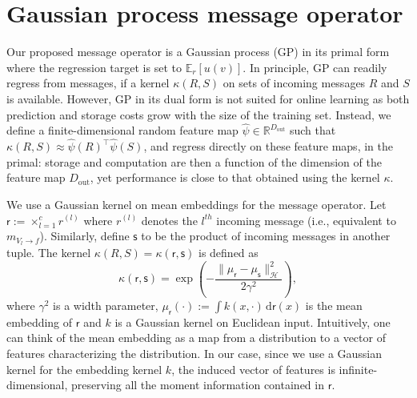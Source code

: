 \documentclass[a4paper,10pt]{article}
\begin{document}
\section{Gaussian process message operator}
Our proposed message operator is a Gaussian process (GP) in its primal form
 where the regression target is set to $\mathbb{E}_r[u(v)]$. In
principle, GP can readily regress from messages, if a kernel
$\kappa(R, S)$ on sets of incoming messages $R$ and $S$ is available. However,
GP in its dual form is not suited for online learning as both prediction and storage 
costs grow with the size of the training set. 
Instead, we define 
a finite-dimensional random feature map $\hat{\psi} \in \mathbb{R}^{D_\mathrm{out}}$ such that 
$\kappa(R, S) \approx \hat{\psi}(R)^\top \hat{\psi}(S)$, 
and regress directly on these feature maps, in the primal: storage and computation 
are then a function of the dimension of the feature map $D_\mathrm{out}$, yet
performance is close to that obtained using the kernel $\kappa$.

We use a Gaussian kernel on mean embeddings for the message operator. Let 
$\mathsf{r}:= \times_{l=1}^c r^{(l)}$ where $r^{(l)}$ denotes the $l^{th}$
incoming message (i.e., equivalent to $m_{V_l \rightarrow f}$). Similarly,
define $\mathsf{s}$ to be the product of incoming messages in another tuple. 
The kernel $\kappa(R, S) = \kappa(\mathsf{r}, \mathsf{s})$ is defined as 
\begin{equation}
\kappa(\mathsf{r}, \mathsf{s}) =
\exp\left(-\frac{\|\mu_{\mathsf{r}}-\mu_{\mathsf{s}}\|_{\mathcal{H}}^{2}}{2\gamma^{2}}\right),
\label{eq:gauss_joint_emb}
\end{equation}
%
where $\gamma^2$ is a width parameter, $\mu_{\mathsf{r}}(\cdot) := \int
k(x, \cdot)\, \mathrm{d}\mathsf{r}(x)$ is the mean embedding of $\mathsf{r}$
and $k$ is a Gaussian kernel on Euclidean input.  Intuitively, one can think of
the mean embedding as a map from a distribution to a vector of features
characterizing the distribution. In our case, since we use 
a Gaussian kernel for the embedding kernel $k$, the induced vector of features is 
infinite-dimensional, preserving all the moment information contained in $\mathsf{r}$.
\end{document}
